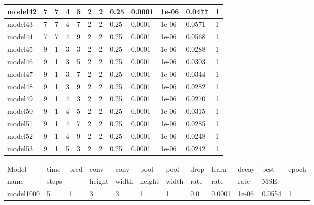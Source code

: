 \documentclass[12pt, twoside]{article}
\begin{document}
\begin{appendices}
\begin{longtable} {|l|l|l|l|l|l|l|l|l|l|l|l|}
		model42 & 7 & 7 & 4 & 5 & 2 & 2 & 0.25 & 0.0001 & 1e-06 & 0.0477 & 1\\ \hline
		model43 & 7 & 7 & 4 & 7 & 2 & 2 & 0.25 & 0.0001 & 1e-06 & 0.0571 & 1\\ \hline
		model44 & 7 & 7 & 4 & 9 & 2 & 2 & 0.25 & 0.0001 & 1e-06 & 0.0568 & 1\\ \hline
		model45 & 9 & 1 & 3 & 3 & 2 & 2 & 0.25 & 0.0001 & 1e-06 & 0.0288 & 1\\ \hline
		model46 & 9 & 1 & 3 & 5 & 2 & 2 & 0.25 & 0.0001 & 1e-06 & 0.0303 & 1\\ \hline
		model47 & 9 & 1 & 3 & 7 & 2 & 2 & 0.25 & 0.0001 & 1e-06 & 0.0344 & 1\\ \hline
		model48 & 9 & 1 & 3 & 9 & 2 & 2 & 0.25 & 0.0001 & 1e-06 & 0.0282 & 1\\ \hline
		model49 & 9 & 1 & 4 & 3 & 2 & 2 & 0.25 & 0.0001 & 1e-06 & 0.0270 & 1\\ \hline
		model50 & 9 & 1 & 4 & 5 & 2 & 2 & 0.25 & 0.0001 & 1e-06 & 0.0315 & 1\\ \hline
		model51 & 9 & 1 & 4 & 7 & 2 & 2 & 0.25 & 0.0001 & 1e-06 & 0.0285 & 1\\ \hline
		model52 & 9 & 1 & 4 & 9 & 2 & 2 & 0.25 & 0.0001 & 1e-06 & 0.0248 & 1\\ \hline
		model53 & 9 & 1 & 5 & 3 & 2 & 2 & 0.25 & 0.0001 & 1e-06 & 0.0242 & 1\\ \hline
	\end{longtable}
	
	
	\begin{longtable}{|l|l|l|l|l|l|l|l|l|l|l|l|}
		\hline
		Model & time & pred & conv & conv   & pool & pool   & drop & learn & decay & best & epoch \\
		name & steps &     & height & width & height & width & rate & rate & rate & MSE & \\ \hline
		model1000 & 5 & 1 & 3 & 3 & 1 & 1 & 0.0 & 0.0001 & 1e-06 & 0.0554 & 1\\ \hline
	\end{longtable}
	
	

\end{appendices}
\end{document}
